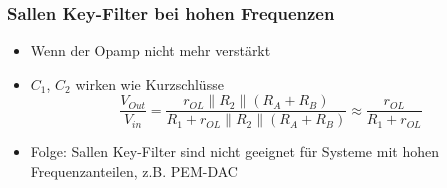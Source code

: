 \subsubsection{Sallen Key-Filter bei hohen Frequenzen}
\begin{itemize}
  \item Wenn der Opamp nicht mehr verstärkt
  \item $C_1$, $C_2$ wirken wie Kurzschlüsse
  \begin{equation*}
  \frac{V_{Out}}{V_{in}}=\frac{r_{OL}\parallel R_2\parallel
  (R_{A}+R_{B})}{R_1+r_{OL}\parallel R_2\parallel (R_{A}+R_{B})}\approx
  \frac{r_{OL}}{R_1+r_{OL}}
  \end{equation*}
  \item Folge: Sallen Key-Filter sind nicht geeignet für Systeme mit hohen
  Frequenzanteilen, z.B. PEM-DAC
\end{itemize}


